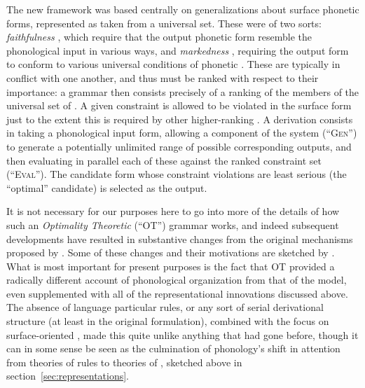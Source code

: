 The new framework was based centrally on generalizations about surface
phonetic forms, represented as  taken from a universal
set. These were of two sorts: \emph{faithfulness} , which
require that the output phonetic form resemble the phonological input
in various ways, and \emph{markedness} , requiring the
output form to conform to various universal conditions of phonetic
. These are typically in conflict with one another, and
thus must be ranked with respect to their importance: a grammar then
consists precisely of a ranking of the members of the universal set of
. A given constraint is allowed to be violated in the
surface form just to the extent this is required by other
higher-ranking . A derivation consists in taking a
phonological input form, allowing a component of the system
(``\textsc{Gen}'') to generate a potentially unlimited range of
possible corresponding outputs, and then evaluating in parallel each
of these against the ranked constraint set (``\textsc{Eval}''). The
candidate form whose constraint violations are least serious (the
``optimal'' candidate) is selected as the output.

It is not necessary for our purposes here to go into more of the
details of how such an \emph{Optimality Theoretic} (``OT'') grammar
works, and indeed subsequent developments have resulted in substantive
changes from the original mechanisms proposed by
\citet{prince:smolensky:optimality}. Some of these changes and their
motivations are sketched by \citet{vanOostendorp21:optimality}. What
is most important for present purposes is the fact that OT provided a
radically different account of phonological organization from that of
the \textsl{} model, even supplemented with all of the
representational innovations discussed above. The absence of language
particular rules, or any sort of serial derivational structure (at
least in the original formulation), combined with the focus on
surface-oriented , made this quite unlike anything that had
gone before, though it can in some sense be seen as the culmination of
phonology's shift in attention from theories of rules to theories of
, sketched above in section~\ref{sec:representations}.

